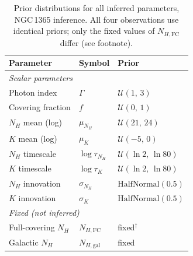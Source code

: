 \documentclass{aa}
\begin{document}
\begin{table}
\caption{Prior distributions for all inferred parameters, NGC\,1365 inference.
         All four observations use identical priors; only the fixed values of
         $N_{H,\mathrm{FC}}$ differ (see footnote).}
\label{tab:ngc1365_priors}
\centering
\begin{tabular}{lll}
\hline\hline
Parameter & Symbol & Prior \\%
\hline
\multicolumn{3}{l}{\textit{Scalar parameters}} \\
Photon index       & $\Gamma$            & $\mathcal{U}(1,\,3)$ \\ %
Covering fraction  & $f$                 & $\mathcal{U}(0,\,1)$       \\  %
$N_H$ mean (log)   & $\mu_{N_H}$         & $\mathcal{U}(21,\,24)$      \\ %
$K$ mean (log)     & $\mu_{K}$           & $\mathcal{U}(-5,\,0)$       \\ %
$N_H$ timescale    & $\log\tau_{N_H}$    & $\mathcal{U}(\ln 2,\,\ln 80)$ \\%
$K$ timescale      & $\log\tau_{K}$      & $\mathcal{U}(\ln 2,\,\ln 80)$ \\%
$N_H$ innovation   & $\sigma_{N_H}$      & $\mathrm{HalfNormal}(0.5)$   \\%
$K$ innovation     & $\sigma_{K}$        & $\mathrm{HalfNormal}(0.5)$   \\%
\hline
\multicolumn{3}{l}{\textit{Fixed (not inferred)}} \\
Full-covering $N_H$ & $N_{H,\mathrm{FC}}$ & fixed$^\dagger$            \\ %
Galactic $N_H$      & $N_{H,\mathrm{gal}}$ & fixed                      \\%
\hline
\end{tabular}
\end{table}
\end{document}
